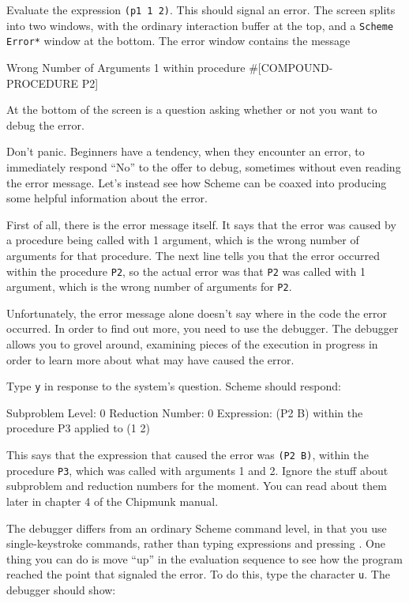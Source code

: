 Evaluate the expression {\tt (p1 1 2)}.  This should signal an error.
The screen splits into two windows, with the ordinary interaction
buffer at the top, and a {\tt *Scheme Error*} window at the bottom.
The error window contains the message

\beginlisp
Wrong Number of Arguments 1
within procedure \#[COMPOUND-PROCEDURE P2]
\endlisp

\noindent
At the bottom of the screen is a question asking whether or not you
want to debug the error.

Don't panic.  Beginners have a tendency, when they encounter an error,
to immediately respond ``No'' to the offer to debug, sometimes without
even reading the error message.  Let's instead see how Scheme can be
coaxed into producing some helpful information about the error.

First of all, there is the error message itself.  It says that the
error was caused by a procedure being called with 1 argument, which is
the wrong number of arguments for that procedure.  The next line tells
you that the error occurred within the procedure {\tt P2}, so the
actual error was that {\tt P2} was called with 1 argument, which is
the wrong number of arguments for {\tt P2}.

Unfortunately, the error message alone doesn't say where in the code
the error occurred.  In order to find out more, you need to use the
debugger.  The debugger allows you to grovel around, examining pieces
of the execution in progress in order to learn more about what may
have caused the error.

Type {\tt y} in response to the system's question.
Scheme should respond:

\beginlisp
Subproblem Level: 0  Reduction Number: 0
Expression:
(P2 B)
within the procedure P3
applied to (1 2)
\endlisp

This says that the expression that caused the error was {\tt (P2 B)},
within the procedure {\tt P3}, which was called with arguments 1 and
2.  Ignore the stuff about subproblem and reduction numbers for the
moment.  You can read about them later in chapter 4 of the Chipmunk
manual.

The debugger differs from an ordinary Scheme command level, in that you use
single-keystroke commands, rather than typing expressions and pressing
.  One thing you can do is move ``up'' in the evaluation sequence
to see how the program reached the point that signaled the error.  To do this,
type the character {\tt u}.  The debugger should show:

